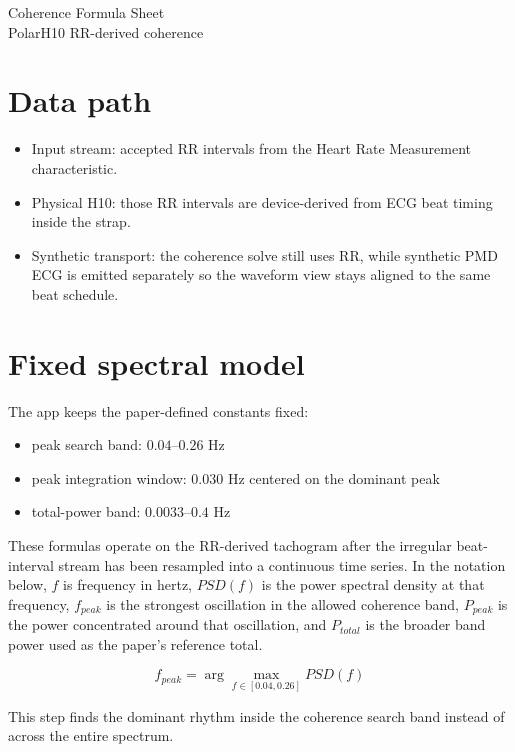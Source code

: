 \documentclass[11pt]{article}
\begin{document}
\begin{center}
{\LARGE Coherence Formula Sheet}\\[0.5em]
{\large PolarH10 RR-derived coherence}
\end{center}

\section*{Data path}

\begin{itemize}[leftmargin=1.5em]
\item Input stream: accepted RR intervals from the Heart Rate Measurement characteristic.
\item Physical H10: those RR intervals are device-derived from ECG beat timing inside the strap.
\item Synthetic transport: the coherence solve still uses RR, while synthetic PMD ECG is emitted separately so the waveform view stays aligned to the same beat schedule.
\end{itemize}

\section*{Fixed spectral model}

The app keeps the paper-defined constants fixed:

\begin{itemize}[leftmargin=1.5em]
\item peak search band: $0.04$--$0.26$ Hz
\item peak integration window: $0.030$ Hz centered on the dominant peak
\item total-power band: $0.0033$--$0.4$ Hz
\end{itemize}

These formulas operate on the RR-derived tachogram after the irregular
beat-interval stream has been resampled into a continuous time series. In the
notation below, $f$ is frequency in hertz, $PSD(f)$ is the power spectral
density at that frequency, $f_{peak}$ is the strongest oscillation in the
allowed coherence band, $P_{peak}$ is the power concentrated around that
oscillation, and $P_{total}$ is the broader band power used as the paper's
reference total.

\[
f_{peak} = \arg\max_{f \in [0.04, 0.26]} PSD(f)
\]

This step finds the dominant rhythm inside the coherence search band instead of
across the entire spectrum.
\end{document}
